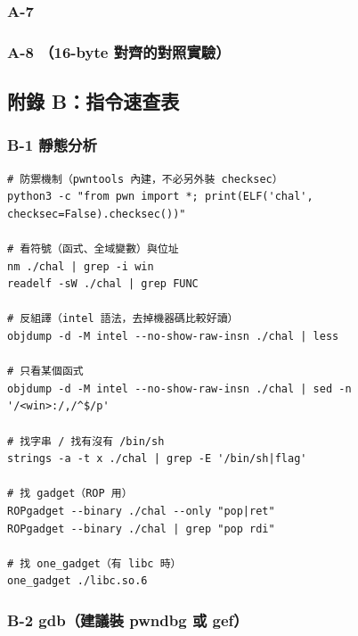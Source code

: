 

\subsubsection*{A-7 }



\subsubsection*{A-8 （16-byte 對齊的對照實驗）}



\subsection{附錄 B：指令速查表}

\subsubsection*{B-1 靜態分析}

\begin{lstlisting}[style=sh]
# 防禦機制（pwntools 內建，不必另外裝 checksec）
python3 -c "from pwn import *; print(ELF('chal', checksec=False).checksec())"

# 看符號（函式、全域變數）與位址
nm ./chal | grep -i win
readelf -sW ./chal | grep FUNC

# 反組譯（intel 語法，去掉機器碼比較好讀）
objdump -d -M intel --no-show-raw-insn ./chal | less

# 只看某個函式
objdump -d -M intel --no-show-raw-insn ./chal | sed -n '/<win>:/,/^$/p'

# 找字串 / 找有沒有 /bin/sh
strings -a -t x ./chal | grep -E '/bin/sh|flag'

# 找 gadget（ROP 用）
ROPgadget --binary ./chal --only "pop|ret"
ROPgadget --binary ./chal | grep "pop rdi"

# 找 one_gadget（有 libc 時）
one_gadget ./libc.so.6
\end{lstlisting}

\subsubsection*{B-2 gdb（建議裝 pwndbg 或 gef）}

